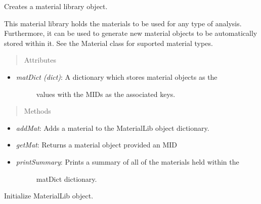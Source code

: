 \documentclass[letterpaper,10pt,english]{sphinxmanual}
\begin{document}
\begin{fulllineitems}
\label{structures:AeroComBAT.Structures.MaterialLib}
Creates a material library object.

This material library holds the materials to be used for any type of
analysis. Furthermore, it can be used to generate new material objects
to be automatically stored within it. See the Material class for suported
material types.
\begin{quote}\begin{description}
\item[{Attributes}] \leavevmode
\end{description}\end{quote}
\begin{itemize}
\item {} \begin{description}
\item[{\emph{matDict (dict)}: A dictionary which stores material objects as the}] \leavevmode
values with the MIDs as the associated keys.

\end{description}

\end{itemize}
\begin{quote}\begin{description}
\item[{Methods}] \leavevmode
\end{description}\end{quote}
\begin{itemize}
\item {} 
\emph{addMat}: Adds a material to the MaterialLib object dictionary.

\item {} 
\emph{getMat}: Returns a material object provided an MID

\item {} \begin{description}
\item[{\emph{printSummary}: Prints a summary of all of the materials held within the}] \leavevmode
matDict dictionary.

\end{description}

\end{itemize}

\begin{fulllineitems}
\label{structures:AeroComBAT.Structures.MaterialLib.__init__}
Initialize MaterialLib object.


\end{fulllineitems}
\end{fulllineitems}
\end{document}
